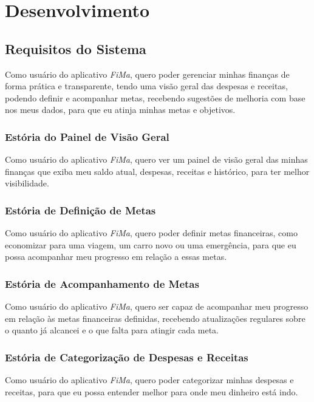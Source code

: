 % 

\chapter[Desenvolvimento]{Desenvolvimento}

\section{Requisitos do Sistema}
Como usuário do aplicativo \textit{FiMa}, quero poder gerenciar minhas finanças de forma prática e transparente, tendo uma visão geral das despesas e receitas, podendo definir e acompanhar metas, recebendo sugestões de melhoria com base nos meus dados, para que eu atinja minhas metas e objetivos.

\subsection{Estória do Painel de Visão Geral}
Como usuário do aplicativo \textit{FiMa}, quero ver um painel de visão geral das minhas finanças que exiba meu saldo atual, despesas, receitas e histórico, para ter melhor visibilidade.

\subsection{Estória de Definição de Metas}
Como usuário do aplicativo \textit{FiMa}, quero poder definir metas financeiras, como economizar para uma viagem, um carro novo ou uma emergência, para que eu possa acompanhar meu progresso em relação a essas metas.

\subsection{Estória de Acompanhamento de Metas}
Como usuário do aplicativo \textit{FiMa}, quero ser capaz de acompanhar meu progresso em relação às metas financeiras definidas, recebendo atualizações regulares sobre o quanto já alcancei e o que falta para atingir cada meta.

\subsection{Estória de Categorização de Despesas e Receitas}
Como usuário do aplicativo \textit{FiMa}, quero poder categorizar minhas despesas e receitas, para que eu possa entender melhor para onde meu dinheiro está indo.

